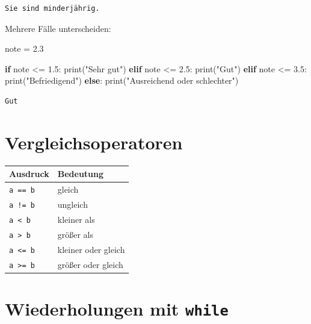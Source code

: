 \documentclass[
  letterpaper,
  DIV=11,
  numbers=noendperiod]{scrreprt}
\newenvironment{Shaded}{\begin{snugshade}}{\end{snugshade}}
\newcommand{\BuiltInTok}[1]{\textcolor[rgb]{0.00,0.23,0.31}{#1}}
\newcommand{\ControlFlowTok}[1]{\textcolor[rgb]{0.00,0.23,0.31}{\textbf{#1}}}
\newcommand{\FloatTok}[1]{\textcolor[rgb]{0.68,0.00,0.00}{#1}}
\newcommand{\NormalTok}[1]{\textcolor[rgb]{0.00,0.23,0.31}{#1}}
\newcommand{\OperatorTok}[1]{\textcolor[rgb]{0.37,0.37,0.37}{#1}}
\newcommand{\StringTok}[1]{\textcolor[rgb]{0.13,0.47,0.30}{#1}}
\begin{document}
\begin{verbatim}
Sie sind minderjährig.
\end{verbatim}

Mehrere Fälle unterscheiden:

\begin{Shaded}
\begin{Highlighting}[]
\NormalTok{note }\OperatorTok{=} \FloatTok{2.3}

\ControlFlowTok{if}\NormalTok{ note }\OperatorTok{\textless{}=} \FloatTok{1.5}\NormalTok{:}
    \BuiltInTok{print}\NormalTok{(}\StringTok{"Sehr gut"}\NormalTok{)}
\ControlFlowTok{elif}\NormalTok{ note }\OperatorTok{\textless{}=} \FloatTok{2.5}\NormalTok{:}
    \BuiltInTok{print}\NormalTok{(}\StringTok{"Gut"}\NormalTok{)}
\ControlFlowTok{elif}\NormalTok{ note }\OperatorTok{\textless{}=} \FloatTok{3.5}\NormalTok{:}
    \BuiltInTok{print}\NormalTok{(}\StringTok{"Befriedigend"}\NormalTok{)}
\ControlFlowTok{else}\NormalTok{:}
    \BuiltInTok{print}\NormalTok{(}\StringTok{"Ausreichend oder schlechter"}\NormalTok{)}
\end{Highlighting}
\end{Shaded}

\begin{verbatim}
Gut
\end{verbatim}

\section{Vergleichsoperatoren}\label{vergleichsoperatoren}

\begin{longtable}[]{@{}ll@{}}
\toprule\noalign{}
Ausdruck & Bedeutung \\
\midrule\noalign{}
\endhead
\bottomrule\noalign{}
\endlastfoot
\texttt{a\ ==\ b} & gleich \\
\texttt{a\ !=\ b} & ungleich \\
\texttt{a\ \textless{}\ b} & kleiner als \\
\texttt{a\ \textgreater{}\ b} & größer als \\
\texttt{a\ \textless{}=\ b} & kleiner oder gleich \\
\texttt{a\ \textgreater{}=\ b} & größer oder gleich \\
\end{longtable}

\section{\texorpdfstring{Wiederholungen mit
\texttt{while}}{Wiederholungen mit while}}\label{wiederholungen-mit-while}
\end{document}

